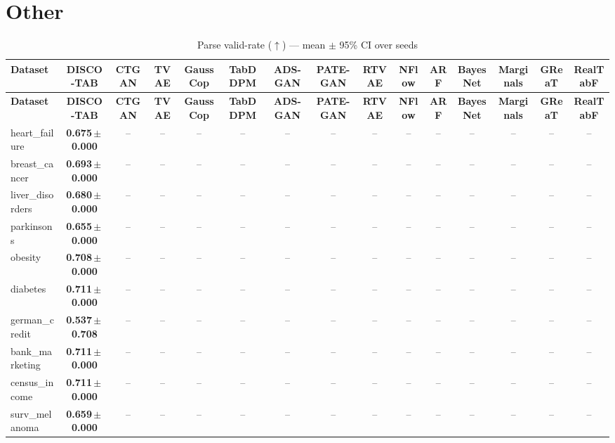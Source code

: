 \documentclass[8pt]{extarticle}
\begin{document}
\section*{Other}
\begin{longtable}{l*{14}{c}}
\caption{Parse valid-rate ($\uparrow$) --- mean $\pm$ 95\% CI over seeds}\\
\toprule
\textbf{Dataset} & \textbf{DISCO-TAB} & \textbf{CTGAN} & \textbf{TVAE} & \textbf{GaussCop} & \textbf{TabDDPM} & \textbf{ADS-GAN} & \textbf{PATE-GAN} & \textbf{RTVAE} & \textbf{NFlow} & \textbf{ARF} & \textbf{BayesNet} & \textbf{Marginals} & \textbf{GReaT} & \textbf{RealTabF} \\
\midrule
\endfirsthead
\toprule
\textbf{Dataset} & \textbf{DISCO-TAB} & \textbf{CTGAN} & \textbf{TVAE} & \textbf{GaussCop} & \textbf{TabDDPM} & \textbf{ADS-GAN} & \textbf{PATE-GAN} & \textbf{RTVAE} & \textbf{NFlow} & \textbf{ARF} & \textbf{BayesNet} & \textbf{Marginals} & \textbf{GReaT} & \textbf{RealTabF} \\
\midrule
\endhead
\bottomrule
\endfoot
heart\_failure & \textbf{0.675\,$\pm$\,0.000} & -- & -- & -- & -- & -- & -- & -- & -- & -- & -- & -- & -- & -- \\
breast\_cancer & \textbf{0.693\,$\pm$\,0.000} & -- & -- & -- & -- & -- & -- & -- & -- & -- & -- & -- & -- & -- \\
liver\_disorders & \textbf{0.680\,$\pm$\,0.000} & -- & -- & -- & -- & -- & -- & -- & -- & -- & -- & -- & -- & -- \\
parkinsons & \textbf{0.655\,$\pm$\,0.000} & -- & -- & -- & -- & -- & -- & -- & -- & -- & -- & -- & -- & -- \\
obesity & \textbf{0.708\,$\pm$\,0.000} & -- & -- & -- & -- & -- & -- & -- & -- & -- & -- & -- & -- & -- \\
diabetes & \textbf{0.711\,$\pm$\,0.000} & -- & -- & -- & -- & -- & -- & -- & -- & -- & -- & -- & -- & -- \\
german\_credit & \textbf{0.537\,$\pm$\,0.708} & -- & -- & -- & -- & -- & -- & -- & -- & -- & -- & -- & -- & -- \\
bank\_marketing & \textbf{0.711\,$\pm$\,0.000} & -- & -- & -- & -- & -- & -- & -- & -- & -- & -- & -- & -- & -- \\
census\_income & \textbf{0.711\,$\pm$\,0.000} & -- & -- & -- & -- & -- & -- & -- & -- & -- & -- & -- & -- & -- \\
surv\_melanoma & \textbf{0.659\,$\pm$\,0.000} & -- & -- & -- & -- & -- & -- & -- & -- & -- & -- & -- & -- & -- \\

\end{longtable}
\end{document}
